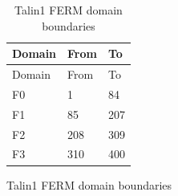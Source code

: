 \documentclass[
  letterpaper,
  DIV=11,
  numbers=noendperiod]{scrartcl}
\begin{document}
\begin{figure}
\begin{minipage}[t]{0.50\linewidth}
\subcaption{\label{fig-r-hist}~}
\end{minipage}%
\newline
\begin{minipage}[t]{\linewidth}

{\centering 


}

\subcaption{\label{fig-ferm-time-ri-npip-all}~}
\end{minipage}%
\newline
\begin{minipage}[t]{0.33\linewidth}

{\centering 

\begin{longtable}[]{@{}lll@{}}
\caption{\label{tbl-ferm-domains}Talin1 FERM domain
boundaries}\tabularnewline
\toprule
Domain & From & To \\
\midrule
\endfirsthead
\toprule
Domain & From & To \\
\midrule
\endhead
F0 & 1 & 84 \\
F1 & 85 & 207 \\
F2 & 208 & 309 \\
F3 & 310 & 400 \\
\bottomrule
\end{longtable}

}

\end{minipage}%
%
\begin{minipage}[t]{0.33\linewidth}


\end{minipage}
\end{figure}
\end{document}
